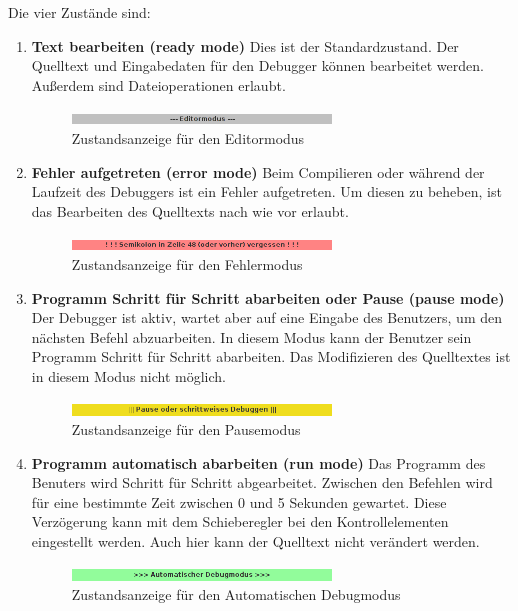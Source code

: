 Die vier Zustände sind:
\begin{enumerate}
\item \textbf{Text bearbeiten (ready mode)}
Dies ist der Standardzustand. Der Quelltext und Eingabedaten für den Debugger können bearbeitet werden. Außerdem sind Dateioperationen erlaubt.
\begin{figure}[h!]
\centering
\includegraphics[width=0.65\textwidth]{./media/images/gui/debugger/mode-idle.png}
\caption{Zustandsanzeige für den Editormodus}
\label{fig:deb-zust-1}
\end{figure}
\item \textbf{Fehler aufgetreten (error mode)}
Beim Compilieren oder während der Laufzeit des Debuggers ist ein Fehler aufgetreten. Um diesen zu beheben, ist das Bearbeiten des Quelltexts nach wie vor erlaubt.
\begin{figure}[h!]
\centering
\includegraphics[width=0.65\textwidth]{./media/images/gui/debugger/mode-error.png}
\caption{Zustandsanzeige für den Fehlermodus}
\label{fig:deb-zust-2}
\end{figure}
\item \textbf{Programm Schritt für Schritt abarbeiten oder Pause (pause mode)}
Der Debugger ist aktiv, wartet aber auf eine Eingabe des Benutzers, um den nächsten Befehl abzuarbeiten. In diesem Modus kann der Benutzer sein Programm Schritt für Schritt abarbeiten. Das Modifizieren des Quelltextes ist in diesem Modus nicht möglich.
\begin{figure}[h!]
\centering
\includegraphics[width=0.65\textwidth]{./media/images/gui/debugger/mode-step.png}
\caption{Zustandsanzeige für den Pausemodus}
\label{fig:deb-zust-3}
\end{figure}
\item \textbf{Programm automatisch abarbeiten (run mode)}
Das Programm des Benuters wird Schritt für Schritt abgearbeitet. Zwischen den Befehlen wird für eine bestimmte Zeit zwischen 0 und 5 Sekunden gewartet. Diese Verzögerung kann mit dem Schieberegler bei den Kontrollelementen eingestellt werden. Auch hier kann der Quelltext nicht verändert werden.
\begin{figure}[h!tp]
\centering
\includegraphics[width=0.65\textwidth]{./media/images/gui/debugger/mode-run.png}
\caption{Zustandsanzeige für den Automatischen Debugmodus}
\label{fig:deb-zust-4}
\end{figure}
\end{enumerate}

